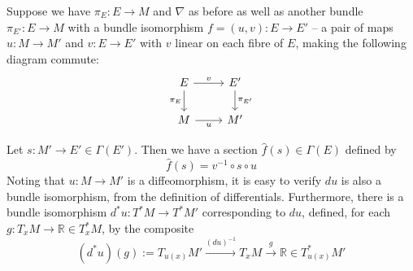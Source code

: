 \documentclass{amsart}
\newcommand{\R}{\mathbb{R}}
\newcommand{\wh}{\widehat}
\renewcommand{\to}[1][]{\stackrel{#1}{\longrightarrow}}
\numberwithin{thm}{section}
\theoremstyle{definition}
\begin{document}
Suppose we have $\pi_E : E \to M$ and $\nabla$ as before as well as another
bundle $\pi_{E'} : E \to M$ with a bundle isomorphism $f = (u, v) : E \to E'$ --
a pair of maps $u : M \to M'$ and $v : E \to E'$ with $v$ linear on each fibre
of $E$, making the following diagram commute:
\[\begin{tikzcd}
E \ar[d, "\pi_E" left] \ar[r, "v" above] & E' \ar[d, "\pi_{E'}" right]\\
M \ar[r, "u" below] & M'
\end{tikzcd}\]

Let $s : M' \to E' \in \Gamma(E')$. Then we have a section
$\wh{f}(s) \in \Gamma(E)$ defined by
\[
  \wh{f}(s) = v^{-1} \circ s \circ u
\]
Noting that $u : M \to M'$ is a diffeomorphism, it is easy to verify $du$
is also a bundle isomorphism, from the definition of differentials. Furthermore,
there is a bundle isomorphism $d^*u : T^*M \to T^*M'$ corresponding to $du$,
defined, for each $g : T_xM \to \R \in T^*_xM$, by the composite
\[
  (d^*u)(g) := T_{u(x)}M' \to[(du)^{-1}] T_xM \to[g] \R \in T^*_{u(x)}M'
\]
\end{document}
